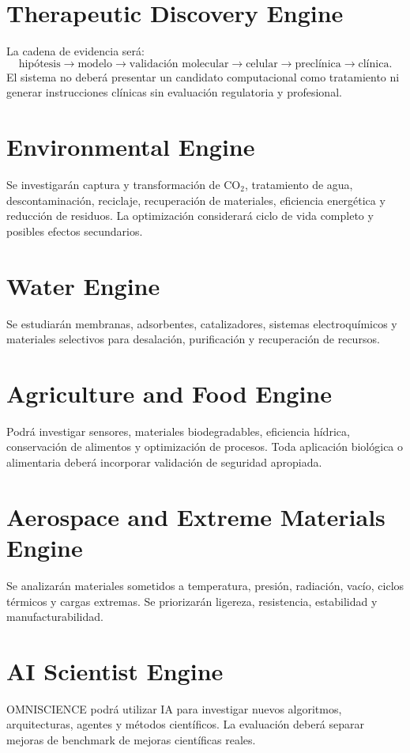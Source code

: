 \documentclass[11pt,a4paper]{article}
\begin{document}
\section{Therapeutic Discovery Engine}
La cadena de evidencia será:
\[
\text{hipótesis}\rightarrow\text{modelo}\rightarrow\text{validación molecular}\rightarrow\text{celular}\rightarrow\text{preclínica}\rightarrow\text{clínica}.
\]
El sistema no deberá presentar un candidato computacional como tratamiento ni generar instrucciones clínicas sin evaluación regulatoria y profesional.

\section{Environmental Engine}
Se investigarán captura y transformación de CO$_2$, tratamiento de agua, descontaminación, reciclaje, recuperación de materiales, eficiencia energética y reducción de residuos. La optimización considerará ciclo de vida completo y posibles efectos secundarios.

\section{Water Engine}
Se estudiarán membranas, adsorbentes, catalizadores, sistemas electroquímicos y materiales selectivos para desalación, purificación y recuperación de recursos.

\section{Agriculture and Food Engine}
Podrá investigar sensores, materiales biodegradables, eficiencia hídrica, conservación de alimentos y optimización de procesos. Toda aplicación biológica o alimentaria deberá incorporar validación de seguridad apropiada.

\section{Aerospace and Extreme Materials Engine}
Se analizarán materiales sometidos a temperatura, presión, radiación, vacío, ciclos térmicos y cargas extremas. Se priorizarán ligereza, resistencia, estabilidad y manufacturabilidad.

\section{AI Scientist Engine}
OMNISCIENCE podrá utilizar IA para investigar nuevos algoritmos, arquitecturas, agentes y métodos científicos. La evaluación deberá separar mejoras de benchmark de mejoras científicas reales.
\end{document}
